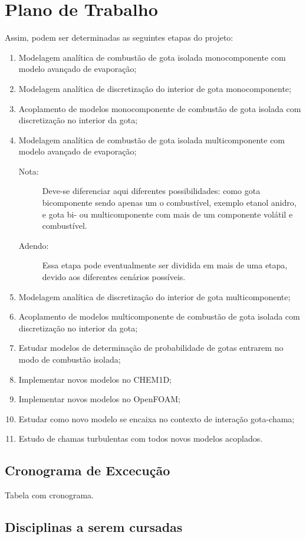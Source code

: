 \section{Plano de Trabalho}


Assim, podem ser determinadas as seguintes etapas do projeto:

\begin{enumerate}
    \item Modelagem  analítica de combustão de gota isolada monocomponente com modelo avançado de evaporação;
    \item Modelagem  analítica de discretização do interior de gota monocomponente;
    \item Acoplamento de modelos monocomponente de combustão de gota isolada com discretização no interior da gota;
    \item Modelagem analítica de combustão de gota isolada multicomponente com modelo avançado de evaporação;
    \begin{description}
        \item[Nota:] Deve-se diferenciar aqui diferentes possibilidades: como gota bicomponente sendo apenas um o combustível, exemplo etanol anidro, e gota bi- ou multicomponente com mais de um componente volátil e combustível.
        \item[Adendo:] Essa etapa pode eventualmente ser dividida em mais de uma etapa, devido aos diferentes cenários possíveis. 
    \end{description}
    \item Modelagem analítica de discretização do interior de gota multicomponente;
    \item Acoplamento de modelos multicomponente de combustão de gota isolada com discretização no interior da gota;
    \item Estudar modelos de determinação de probabilidade de gotas entrarem no modo de combustão isolada;
    \item Implementar novos modelos no CHEM1D;
    \item Implementar novos modelos no OpenFOAM;
    \item Estudar como novo modelo se encaixa no contexto de interação gota-chama;
    \item Estudo de chamas turbulentas com todos novos modelos acoplados.
\end{enumerate}


\subsection{Cronograma de Excecução}

Tabela com cronograma.

\subsection{Disciplinas a serem cursadas}

